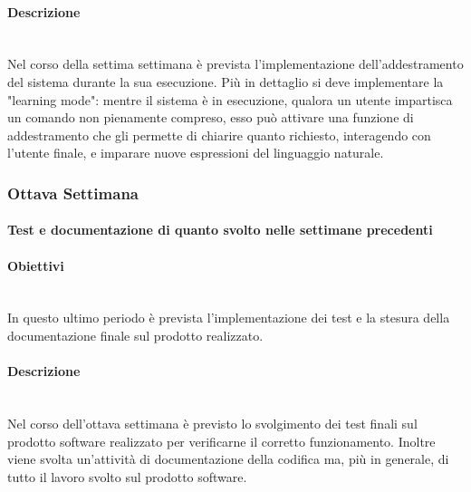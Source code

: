 {	    \paragraph*{Descrizione} \mbox{}\\ [1mm]
    	Nel corso della settima settimana è prevista l'implementazione dell'addestramento del sistema durante la sua esecuzione. Più in dettaglio si deve implementare la "learning mode": mentre il sistema è in esecuzione, qualora un utente impartisca un comando non pienamente compreso, esso può attivare una funzione di addestramento che gli permette di chiarire quanto richiesto, interagendo con l'utente finale, e imparare nuove espressioni del linguaggio naturale. 
    \subsubsection{Ottava Settimana}
    	\paragraph{Test e documentazione di quanto svolto nelle settimane precedenti}
    	\paragraph*{Obiettivi} \mbox{}\\ [1mm]
    	In questo ultimo periodo è prevista l'implementazione dei test e la stesura della documentazione finale sul prodotto realizzato.
	    \paragraph*{Descrizione} \mbox{}\\ [1mm]
        Nel corso dell'ottava settimana è previsto lo svolgimento dei test finali sul prodotto software realizzato per verificarne il corretto funzionamento. Inoltre viene svolta un'attività di documentazione della codifica ma, più in generale, di tutto il lavoro svolto sul prodotto software.
}

\newcommand{\totaleOre}{}

\newcommand{\obiettiviObbligatori}{
	 \item \textbf{OB-1}: studio e analisi di Google Assistant;
	 \item \textbf{OB-2}: implementazione di una skill basata su un intent per Google Assistant, sottoforma di proof of concept;
 	 \item \textbf{OB-3}: studio e analisi di Amazon Alexa;
	 \item \textbf{OB-4}: implementazione di una skill basata su un intent per Amazon Alexa, sottoforma di proof of concept; 
	 \item \textbf{OB-5}: stesura analisi comparativa delle tecnologie studiate;
	 \item \textbf{OB-6}: studio dell'algoritmo HPP (Hidden Probabilistic Parser);
	 \item \textbf{OB-7}: realizzazione di una grammatica che implementi una skill non banale, integrata al sistema Zucchetti esistente.
}

